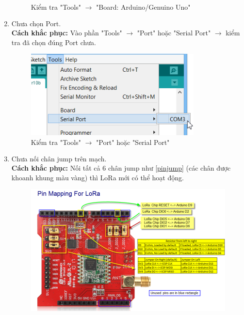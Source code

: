\begin{enumerate}
\begin{center}
\begin{figure}[htp]
\begin{center}
\end{center}
\caption{Kiểm tra "Tools" $\rightarrow$ "Board: Arduino/Genuino Uno"}
\end{figure}
\end{center}
\item Chưa chọn Port.\\
\textbf{Cách khắc phục:} Vào phần "Tools" $\rightarrow$ "Port" hoặc "Serial Port" $\rightarrow$ kiểm tra đã chọn đúng Port chưa.
\begin{center}
\begin{figure}[htp]
\begin{center}
\includegraphics[scale=1.1]{image4/loi4.png}
\end{center}
\caption{Kiểm tra "Tools" $\rightarrow$ "Port" hoặc "Serial Port"}
\end{figure}
\end{center}
\item Chưa nối chân jump trên mạch.\\
\textbf{Cách khắc phục:} Nối tất cả 6 chân jump như \ref{pinjump} (các chân được khoanh khung màu vàng) thì LoRa mới có thể hoạt động.
\begin{center}
\begin{figure}[htp]
\begin{center}
\includegraphics[scale=0.7]{image4/loi5.png}

\end{center}
\end{figure}
\end{center}
\end{enumerate}
